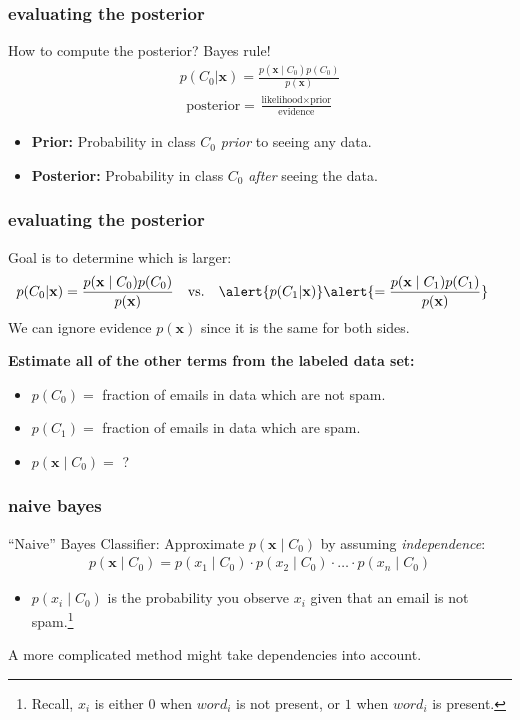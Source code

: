 \documentclass[handout,compress]{beamer}
\newcommand{\bv}[1]{\mathbf{#1}}
\begin{document}
\begin{frame}
	\frametitle{evaluating the posterior}
	How to compute the posterior? Bayes rule!
	\begin{align}
		p(C_0 | \bv{x}) = \frac{p(\bv{x}\mid C_0)p(C_0)}{p(\bv{x})}
	\end{align}
	\begin{align}
	\text{posterior} = \frac{\text{likelihood}\times \text{prior}}{\text{evidence}}
	\end{align}
	\begin{itemize}
		\item \textbf{Prior:} Probability in class $C_0$ \emph{prior} to seeing any data.
		\item \textbf{Posterior:} Probability in class $C_0$ \emph{after} seeing the data.
	\end{itemize}
\end{frame}

\begin{frame}
	\frametitle{evaluating the posterior}
Goal is to determine which is larger:
\begin{align*}
p(C_0 | \bv{x}) &= \frac{p(\bv{x}\mid C_0)p(C_0)}{p(\bv{x})} & &\text{vs.} & \alert{p(C_1 | \bv{x}) }&\alert{= \frac{p(\bv{x}\mid C_1)p(C_1)}{p(\bv{x})} }
\end{align*}
We can ignore evidence $p(\bv{x})$ since it is the same for both sides.

\textbf{Estimate all of the other terms from the labeled data set:}
\begin{itemize}
	\item $p(C_0)=$ fraction of emails in data which are not spam.
	\item $p(C_1)=$ fraction of emails in data which are spam.
	\item $p(\bv{x} \mid C_0)=$ ?
\end{itemize}
\end{frame}

\begin{frame}
	\frametitle{naive bayes}
	``Naive'' Bayes Classifier: Approximate $p(\bv{x} \mid C_0)$ by assuming \emph{independence}:
	\begin{align*}
	p(\bv{x} \mid C_0) = p({x}_1 \mid C_0) \cdot p({x}_2 \mid C_0) \cdot \ldots \cdot p({x}_n \mid C_0)
	\end{align*}

	\begin{itemize}
		\item $p({x}_i \mid C_0)$ is the probability you observe $x_i$ given that an email is not spam.\footnote{Recall, $x_i$ is either $0$ when $word_i$ is not present, or $1$ when $word_i$ is present.} 
	\end{itemize}

A more complicated method might take dependencies into account.
\end{frame}
\end{document}
